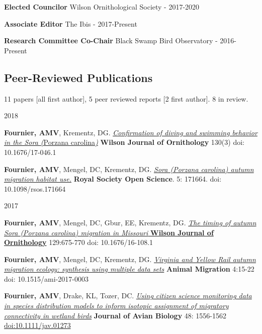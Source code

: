 \documentclass[]{article}
\begin{document}
\textbf{Elected Councilor} Wilson Ornithological Society - 2017-2020

\textbf{Associate Editor} The Ibis - 2017-Present

\textbf{Research Committee Co-Chair} Black Swamp Bird Observatory -
2016-Present

\subsection{Peer-Reviewed
Publications}\label{peer-reviewed-publications}

11 papers {[}all first author{]}, 5 peer reviewed reports {[}2 first
author{]}. 8 in review.

2018

\textbf{Fournier, AMV}, Krementz, DG.
\href{https://github.com/aurielfournier/aurielfournier.github.io/blob/master/_pdfs/Fournier\%20and\%20Krementz\%202018\%20-\%20Wilson\%20Journal\%20of\%20Ornithology.pdf}{\emph{Confirmation
of diving and swimming behavior in the Sora (}Porzana carolina\emph{)}}
\textbf{Wilson Journal of Ornithology} 130(3) doi: 10.1676/17-046.1

\textbf{Fournier, AMV}, Mengel, DC, Krementz, DG.
\href{https://github.com/aurielfournier/aurielfournier.github.io/blob/master/_pdfs/Fournier_et_al_2018_sora_habitat.pdf}{\emph{Sora
(Porzana carolina) autumn migration habitat use.}} \textbf{Royal Society
Open Science}. 5: 171664. doi: 10.1098/rsos.171664

2017

\textbf{Fournier, AMV}, Mengel, DC, Gbur, EE, Krementz, DG.
\href{https://github.com/aurielfournier/aurielfournier.github.io/blob/master/_pdfs/Fournier_et_al_2017_Wilson.pdf}{\emph{The
timing of autumn Sora (Porzana carolina) migration in Missouri}
\textbf{Wilson Journal of Ornithology}} 129:675-770 doi:
10.1676/16-108.1

\textbf{Fournier, AMV}, Mengel, DC, Krementz, DG.
\href{https://www.degruyter.com/downloadpdf/j/ami.2017.4.issue-1/ami-2017-0003/ami-2017-0003.pdf}{\emph{Virginia
and Yellow Rail autumn migration ecology: synthesis using multiple data
sets}} \textbf{Animal Migration} 4:15-22 doi: 10.1515/ami-2017-0003

\textbf{Fournier, AMV}, Drake, KL, Tozer, DC.
\href{https://github.com/aurielfournier/aurielfournier.github.io/blob/master/_pdfs/Fournier\%20Drake\%20Tozer\%202017\%20Journal\%20of\%20Avian\%20Biology.pdf}{\emph{Using
citizen science monitoring data in species distribution models to inform
isotopic assignment of migratory connectivity in wetland birds}}
\textbf{Journal of Avian Biology} 48: 1556-1562
\url{doi:10.1111/jav.01273}
\end{document}
